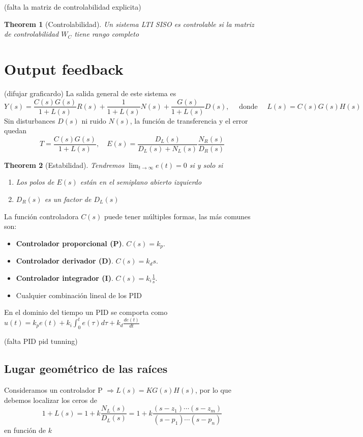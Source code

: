 \documentclass[leqno]{article}
\newtheorem*{theorem}{Theorem}
\begin{document}
(falta la matriz de controlabilidad explicita)

\begin{theorem}[Controlabilidad] Un sistema LTI SISO es controlable si la matriz de controlabilidad $W_C$ tiene rango completo
\end{theorem}



\section{Output feedback}
(difujar graficardo)
La salida general de este sistema es 
\[
Y(s) = \frac{C(s)G(s)}{1+L(s)}R(s) + \frac{1}{1+L(s)}N(s) + \frac{G(s)}{1+L(s)}D(s), \quad \text{ donde } \quad L(s) = C(s)G(s)H(s)
\] 
Sin disturbances $D(s)$ ni ruido $N(s)$, la función de transferencia y el error quedan
\[
T = \frac{C(s)G(s)}{1+L(s)}, \quad E(s) = \frac{D_L(s)}{D_L(s)+N_L(s)} \frac{N_R(s)}{D_R(s)}
\] 

\begin{theorem}[Estabilidad] Tendremos $\lim_{t \to  \infty} e(t) =0$ si y solo si
  \begin{enumerate}[topsep=-6pt, itemsep=0pt]
    \item Los polos de $E(s)$ están en el semiplano abierto izquierdo 
	\item $D_R(s)$ es un factor de  $D_L(s)$
  \end{enumerate}
\end{theorem}

La función controladora $C(s)$ puede tener múltiples formas, las más comunes son:
 \begin{itemize}[topsep=-6pt, itemsep=0pt]
  \item \textbf{Controlador proporcional (P)}. $C(s)=k_p$.
  \item \textbf{Controlador derivador (D)}. $C(s)=k_ds$.
  \item \textbf{Controlador integrador (I)}. $C(s)=k_i \frac{1}{s}$.
  \item Cualquier combinación lineal de los PID
\end{itemize}

En el dominio del tiempo un PID se comporta como $u(t) = k_pe(t)+k_i\int_0^te(\tau )d\tau + k_d \frac{de(t)}{dt}$

(falta PID pid tunning)

\subsection{Lugar geométrico de las raíces}
Consideramos un controlador P $\Rightarrow L(s) = KG(s)H(s)$, por lo que debemos localizar los ceros de 
\[
1+L(s) = 1+k \frac{N_L(s)}{D_L(s)} = 1 + k \frac{(s-z_1)\cdots (s-z_m)}{(s-p_1)\cdots(s-p_n)}
\] 
en función de $k$
\end{document}
